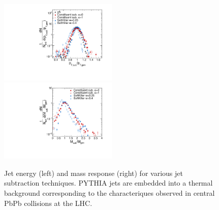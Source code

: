 \begin{figure}[h!]
\centering
\includegraphics[width=0.5\textwidth]{figures/bkgMethods/JetPtResponseMethods.pdf}%
\includegraphics[width=0.5\textwidth]{figures/bkgMethods/JetMassResponseMethods.pdf}%
\caption{Jet energy (left) and mass response (right) for various jet subtraction techniques. PYTHIA jets are embedded into a thermal background corresponding to the characteriques observed in central PbPb collisions at the LHC.}
\label{fig:ResponseMethods}
\end{figure}
